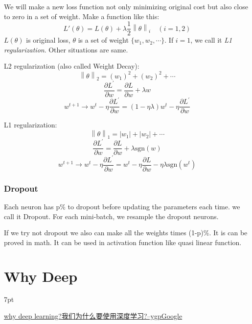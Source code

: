 \documentclass{article}
\newenvironment{quoteblock}{%
\def\FrameCommand{%
\hspace{1pt}%
{\color{DarkBlue}\vrule width 2pt}%
{\color{formalshade}\vrule width 4pt}%
\colorbox{formalshade}%
}%
\MakeFramed{\advance\hsize-\width\FrameRestore}%
\noindent\hspace{-4.55pt}%
\begin{adjustwidth}{}{7pt}%
\vspace{2pt}\vspace{2pt}%
}
{%
\vspace{2pt}\end{adjustwidth}\endMakeFramed%
}
\begin{document}
We will make a new loss function not only minimizing original cost but also close to zero in a set of weight. Make a function like this:
$$
L'(\theta) = L(\theta) + \lambda\frac{1}{2}\left \| \theta \right \|_{i} \quad(i = 1,2)
$$
$L(\theta)$ is original loss, $\theta$ is a set of weight $\{w_1,w_2,\cdots\}$. If $i=1$, we call it \textit{L1 regularization}. Other situations are same.

L2 regularization (also called Weight Decay):
$$
\left \| \theta \right \|_{2}=(w_1)^2+(w_2)^2+\cdots
$$
$$
\frac{\partial{L}^{\prime}}{\partial w}=\frac{\partial{L}}{\partial w}+\lambda w
$$
$$
w^{t+1}\to w^t - \eta \frac{\partial{L}^{\prime}}{\partial w} = (1-\eta\lambda)w^t-\eta\frac{\partial{L}^{\prime}}{\partial w}
$$

L1 regularization:
$$
\left \| \theta \right \|_{1}=|w_1|+|w_2|+\cdots
$$
$$
\frac{\partial{L}^{\prime}}{\partial w}=\frac{\partial{L}}{\partial w}+\lambda \text{sgn}(w)
$$
$$
w^{t+1}\to w^t - \eta \frac{\partial{L}^{\prime}}{\partial w} = w^t-\eta\frac{\partial{L}}{\partial w}-\eta\lambda\text{sgn}(w^t)
$$

\subsubsection{Dropout}

Each neuron has p\% to dropout before updating the parameters each time. we call it Dropout. For each mini-batch, we resample the dropout neurons.

If we try not dropout we also can make all the weights times (1-p)\%. It is can be proved in math. It can be used in activation function like quasi linear function.

\section{Why Deep}

\begin{quoteblock}
    \href{https://blog.csdn.net/ygp12345/article/details/108902064}{why deep learning?我们为什么要使用深度学习?--ygpGoogle}
\end{quoteblock}
\end{document}

